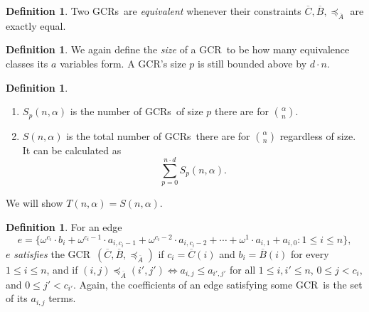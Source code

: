 \documentclass[10pt,a4paper]{article}
\newcommand{\om}{\omega}
\newcommand{\gencrulenospace}{GCR}
\newcommand{\gencrule}{\gencrulenospace~}
\newcommand{\gencrules}{\gencrulenospace s~}
\newcommand{\xleq}{\preceq_{\overline{A}}}
\newcommand{\assny}{\overline{B}}
\newcommand{\assnc}{\overline{C}}
\newcommand{\numpoints}{n}
\newcommand{\inumpoints}{i}
\newcommand{\idegr}{j}
\newcommand{\commonconst}{a}
\newcommand{\rareconst}{b}
\theoremstyle{plain}
\theoremstyle{definition}
\newtheorem{definition}[theorem]{Definition}
\begin{document}
\begin{definition}
    Two \gencrules are \textit{equivalent} whenever their constraints $\assnc, \assny, \xleq$ are
    exactly equal.
\end{definition}

\begin{definition}
We again define the \textit{size} of a \gencrule to be how many equivalence classes its $\commonconst$ variables form. A \gencrulenospace's size $p$ is still bounded above by $d \cdot \numpoints$.
\end{definition}

\begin{definition}~
\begin{enumerate}
\item 
$S_p(\numpoints,\alpha)$ is the number of \gencrules of size $p$ there are for $\binom{\alpha}{\numpoints}$. 
\item 
$S(\numpoints,\alpha)$ is the total number of \gencrules there are for $\binom{\alpha}{\numpoints}$ regardless of size. It can be calculated as $$
\sum_{p=0}^{\numpoints \cdot d} S_p(\numpoints, \alpha).
$$ 
\end{enumerate}
\end{definition}
We will show $T(\numpoints,\alpha) = S(\numpoints,\alpha)$.

\begin{definition}\label{def:gcrule-coef}
For an edge $$e=\{\om^{c_{\inumpoints}} \cdot \rareconst_{\inumpoints} + \om^{c_{\inumpoints}-1} \cdot \commonconst_{\inumpoints,c_{\inumpoints}-1} + \om^{c_{\inumpoints}-2} \cdot \commonconst_{\inumpoints,c_{\inumpoints}-2} + \cdots + \om^1 \cdot \commonconst_{\inumpoints,1} + \commonconst_{\inumpoints,0} \colon 1 \leq \inumpoints \leq \numpoints\},$$
$e$ \textit{satisfies} the \gencrule $(\assnc,\assny, \xleq)$ if $c_{\inumpoints} = \assnc(\inumpoints)$ and $\rareconst_{\inumpoints} = \assny(\inumpoints)$ for every $1 \leq \inumpoints\leq \numpoints$, and if $(\inumpoints,\idegr) \xleq (\inumpoints',\idegr') \iff \commonconst_{\inumpoints,\idegr}\leq \commonconst_{\inumpoints',\idegr'}$ for all $1 \leq \inumpoints,\inumpoints'\leq \numpoints$, $0 \leq \idegr < c_{\inumpoints},$ and $0 \leq \idegr' < c_{\inumpoints'}.$
Again, the coefficients of an edge satisfying some \gencrule is the set of its
$a_{i,j}$ terms.
\end{definition}
\end{document}

